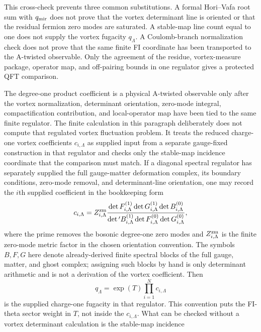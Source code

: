 \begin{remark}
This cross-check prevents three common substitutions.  A formal Hori--Vafa
root sum with \(q_{\rm mir}\) does not prove that the vortex determinant line
is oriented or that the residual fermion zero modes are saturated.  A
stable-map line count equal to one does not supply the vortex fugacity
\(q_\Lambda\).  A Coulomb-branch normalization check does not prove that the
same finite FI coordinate has been transported to the A-twisted observable.
Only the agreement of the residue, vortex-measure package, operator map, and
off-pairing bounds in one regulator gives a protected QFT comparison.
\end{remark}

\begin{remark}
\label{rem:cpn-degree-one-vortex-observable-proof-obligation-template}
The degree-one product coefficient is a physical A-twisted observable only after
the vortex normalization, determinant orientation, zero-mode integral,
compactification contribution, and local-operator map have been tied to the
same finite regulator.  The finite calculation in this paragraph deliberately
does not compute that regulated vortex fluctuation problem.  It treats the
reduced charge-one vortex coefficients \(c_{i,\Lambda}\) as supplied input from a
separate gauge-fixed construction in that regulator and checks only the
stable-map incidence coordinate that the comparison must match.  If a diagonal
spectral regulator has separately supplied the full gauge-matter deformation
complex, its
boundary conditions, zero-mode removal, and determinant-line orientation, one
may record the \(i\)th supplied coefficient in the bookkeeping form
\[
  c_{i,\Lambda}
  =
  Z_{i,\Lambda}^{\rm zm}
  \frac{
    \det F_{i,\Lambda}^{(1)}\det G_{i,\Lambda}^{(1)}
    \det B_{i,\Lambda}^{(0)}
  }{
    \det{}' B_{i,\Lambda}^{(1)}
    \det F_{i,\Lambda}^{(0)}
    \det G_{i,\Lambda}^{(0)}
  },
\]
where the prime removes the bosonic degree-one zero modes and
\(Z_{i,\Lambda}^{\rm zm}\) is the finite zero-mode metric factor in the chosen
orientation convention.  The symbols \(B,F,G\) here denote already-derived
finite spectral blocks of the full gauge, matter, and ghost complex; assigning
such blocks by hand is only determinant arithmetic and is not a derivation of
the vortex coefficient.  Then
\[
  q_\Lambda=\exp(T)\prod_{i=1}^N c_{i,\Lambda}
\]
is the supplied charge-one fugacity in that regulator.  This convention puts
the FI-theta sector weight in \(T\), not inside the \(c_{i,\Lambda}\).  What can
be checked without a vortex determinant calculation is the stable-map incidence

\end{remark}
